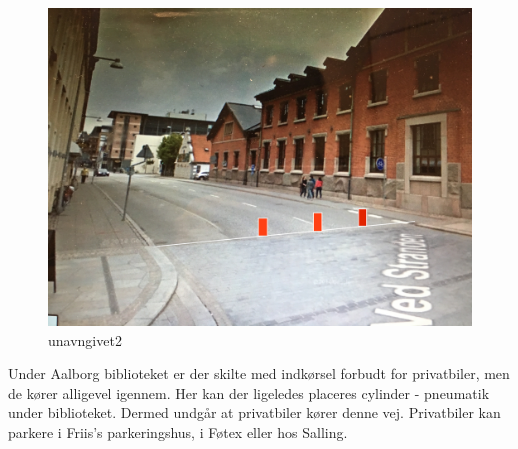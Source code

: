                                        
\begin{figure}[htbp]
  \centering
  \begin{adjustbox}{max width=\textwidth}
    \includegraphics{figures/Billederogfigur/3.jpg}
 \end{adjustbox}
  \caption{unavngivet2}
   \label{fig:unavngivet2}
\end{figure}                                                                                           
Under Aalborg biblioteket er der skilte med indkørsel forbudt for privatbiler, men de kører alligevel igennem. Her kan der ligeledes placeres cylinder - pneumatik under biblioteket. Dermed undgår at privatbiler kører denne vej. Privatbiler kan parkere i Friis’s parkeringshus, i Føtex eller hos Salling.                         
                                                   

